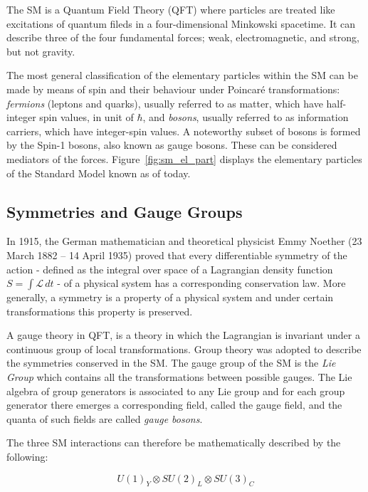 		The SM is a Quantum Field Theory (QFT) where particles are treated like excitations of quantum fileds in a four-dimensional Minkowski spacetime. It can describe three of the four fundamental forces; weak, electromagnetic, and strong, but not gravity.

		The most general classification of the elementary particles within the SM can be made by means of spin and their behaviour under Poincaré transformations: \textit{fermions} (leptons and quarks), usually referred to as matter, which have half-integer spin values, in unit of $\hbar$, and \textit{bosons}, usually referred to as information carriers, which have integer-spin values. A noteworthy subset of bosons is formed by the Spin-1 bosons, also known as gauge bosons. These can be considered mediators of the forces. Figure~\ref{fig:sm_el_part} displays the elementary particles of the Standard Model known as of today.



		\subsection*{Symmetries and Gauge Groups}

			In 1915, the German mathematician and theoretical physicist Emmy Noether (23 March 1882 – 14 April 1935) proved that every differentiable symmetry of the action - defined as the integral over space of a Lagrangian density function $S = \int \mathcal{L}\, dt$ - of a physical system has a corresponding conservation law. More generally, a symmetry is a property of a physical system and under certain transformations this property is preserved. 

			A gauge theory in QFT, is a theory in which the Lagrangian is invariant under a continuous group of local transformations. Group theory was adopted to describe the symmetries conserved in the SM. The gauge group of the SM is the \emph{Lie Group} which contains all the transformations between possible gauges. The Lie algebra of group generators is associated to any Lie group and for each group generator there emerges a corresponding field, called the gauge field, and the quanta of such fields are called \emph{gauge bosons}.
			
			The three SM interactions can therefore be mathematically described by the following:

			\begin{equation}
			\label{eq:SM_gaugeSym}
				U(1)_Y \otimes SU(2)_L \otimes SU(3)_C
			\end{equation}

